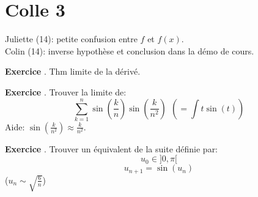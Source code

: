 \documentclass[10pt,a4paper]{article}
\newcounter{question}
\newcounter{exo}
\newenvironment{exo}{\vspace{0.5cm}\setcounter{question}{0}\addtocounter{exo}{1} \noindent \textbf{Exercice \theexo}. \normalsize }{\par}
\begin{document}
	\section*{Colle 3}
	\setcounter{exo}{0}
	Juliette (14): petite confusion entre $f$ et $f(x)$.\\
	Colin (14): inverse hypothèse et conclusion dans la démo de cours.\\
	
	\begin{exo}
		Thm limite de la dérivé.
	\end{exo}

	\begin{exo}
		Trouver la limite de:
		$$\sum_{k=1}^{n} \sin(\frac{k}{n}) \sin(\frac{k}{n^2}) ~~(= \int t \sin(t))$$
		Aide: $\sin(\frac{k}{n^2}) \approx \frac{k}{n^2}$.
	\end{exo}
	\begin{exo}
		Trouver un équivalent de la suite définie par:
		$$u_0 \in ]0, \pi[$$
		$$u_{n+1} = \sin(u_n)$$
		($u_n \sim \sqrt{\frac{6}{n}}$)
	\end{exo}
\end{document}
